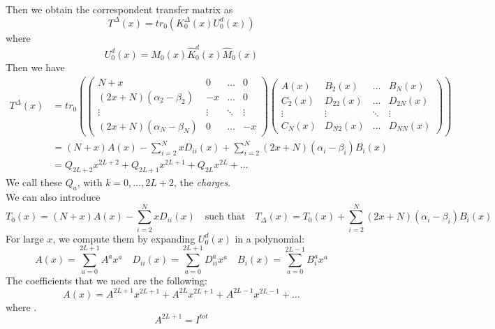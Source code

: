 \documentclass[11pt]{article}
\numberwithin{equation}{section}
\numberwithin{equation}{subsection}
\begin{document}
Then we obtain the correspondent transfer matrix as
\begin{equation}
	T^{\Delta}(x)=tr_{0}\left(K_{0}^{\Delta}(x)U_{0}^{d}(x)\right)
\end{equation}
where
\begin{equation}
	U_{0}^{d}(x)=M_{0}(x)\widehat{K}_{0}^{d}(x)\widehat{M}_{0}(x)
\end{equation}
Then we have
\begin{equation}
	\begin{split}
	T^{\Delta}(x)&=tr_{0}\left(\begin{pmatrix}
		N+x&0&\ldots&0\\
		(2x+N)(\alpha_{2}-\beta_{2})&-x&\ldots&0\\
		\vdots&\vdots&\ddots&\vdots\\
		(2x+N)(\alpha_{N}-\beta_{N})&0&\ldots&-x
	\end{pmatrix}\begin{pmatrix}
	A(x)&B_{2}(x)&\ldots&B_{N}(x)\\
	C_{2}(x)&D_{22}(x)&\ldots&D_{2N}(x)\\
	\vdots&\vdots&\ddots&\vdots\\
	C_{N}(x)&D_{N2}(x)&\ldots&D_{NN}(x)
\end{pmatrix}\right)\\&=
(N+x)A(x)-\sum_{i=2}^{N}xD_{ii}(x)+\sum_{i=2}^{N}(2x+N)(\alpha_{i}-\beta_{i})B_{i}(x)\\&=
Q_{2L+2}x^{2L+2}+Q_{2L+1}x^{2L+1}+Q_{2L}x^{2L}+\ldots
\end{split}
\end{equation}
We call these $Q_{a}$, with $k=0,\ldots,2L+2$, the \textit{charges}. \\
We can also introduce 
\begin{equation}
	T_{0}(x)=(N+x)A(x)-\sum_{i=2}^{N}xD_{ii}(x)\quad\text{such that}\quad T_{\Delta}(x)=T_{0}(x)+\sum_{i=2}^{N}(2x+N)(\alpha_{i}-\beta_{i})B_{i}(x)
\end{equation}For large $x$, we compute them by expanding $U_{0}^{d}(x)$ in a polynomial: 
\begin{equation}
	A(x)=\sum_{a=0}^{2L+1}A^{a}x^{a}\quad D_{ii}(x)=\sum_{a=0}^{2L+1}D_{ii}^{a}x^{a}\quad B_{i}(x)=\sum_{a=0}^{2L-1}B_{i}^{a}x^{a}
\end{equation}
The coefficients that we need are the following:
\begin{equation}
	A(x)=A^{2L+1}x^{2L+1}+A^{2L}x^{2L+1}+A^{2L-1}x^{2L-1}+\ldots
\end{equation}
where .
\begin{equation}
	A^{2L+1}=I^{tot}
\end{equation}
\end{document}
